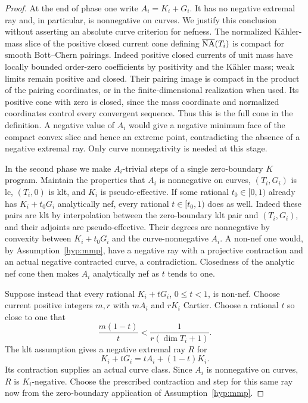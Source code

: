 \begin{proof}
At the end of phase one write $A_i=K_i+G_i$.  It has no negative
extremal ray and, in particular, is nonnegative on curves.  We
justify this conclusion without asserting an absolute curve
criterion for nefness.  The normalized K\"ahler-mass slice of the
positive closed current cone defining
$\overline{\mathrm{NA}}(T_i)$ is compact for smooth Bott--Chern pairings.
Indeed positive closed currents of unit mass have locally bounded
order-zero coefficients by positivity and the K\"ahler mass; weak
limits remain positive and closed.  Their pairing image is compact
in the product of the pairing coordinates, or in the
finite-dimensional realization when used.  Its positive cone with
zero is closed, since the mass coordinate and normalized
coordinates control every convergent sequence.  Thus this is the
full cone in the definition.  A negative value of $A_i$ would give
a negative minimum face of the compact convex slice and hence an
extreme point, contradicting the absence of a negative extremal
ray.  Only curve nonnegativity is needed at this stage.

In the second phase we make $A_i$-trivial steps of a single
zero-boundary $K$ program.  Maintain the properties that $A_i$ is
nonnegative on curves, $(T_i,G_i)$ is lc, $(T_i,0)$ is klt, and
$K_i$ is pseudo-effective.  If some rational $t_0\in[0,1)$ already
has $K_i+t_0G_i$ analytically nef, every rational $t\in[t_0,1)$
does as well.  Indeed these pairs are klt by interpolation between
the zero-boundary klt pair and $(T_i,G_i)$, and their adjoints are
pseudo-effective.  Their degrees are nonnegative by convexity
between $K_i+t_0G_i$ and the curve-nonnegative $A_i$.  A non-nef
one would, by Assumption~\ref{hyp:mmp}, have a negative ray with a
projective contraction and an actual negative contracted curve, a
contradiction.  Closedness of the analytic nef cone then makes
$A_i$ analytically nef as $t$ tends to one.

Suppose instead that every rational $K_i+tG_i$, $0\leq t<1$, is
non-nef.  Choose current positive integers $m,r$ with $mA_i$ and
$rK_i$ Cartier.  Choose a rational $t$ so close to one that
\begin{equation}
 \frac{m(1-t)}{t}<\frac{1}{r(\dim T_i+1)}.
 \label{bir:near-one-choice}
\end{equation}
The klt assumption gives a negative extremal ray $R$ for
\[
 K_i+tG_i=tA_i+(1-t)K_i.
\]
Its contraction supplies an actual curve class.  Since $A_i$ is
nonnegative on curves, $R$ is $K_i$-negative.  Choose the prescribed
contraction and step for this same ray now from the zero-boundary
application of Assumption~\ref{hyp:mmp}.


\end{proof}
